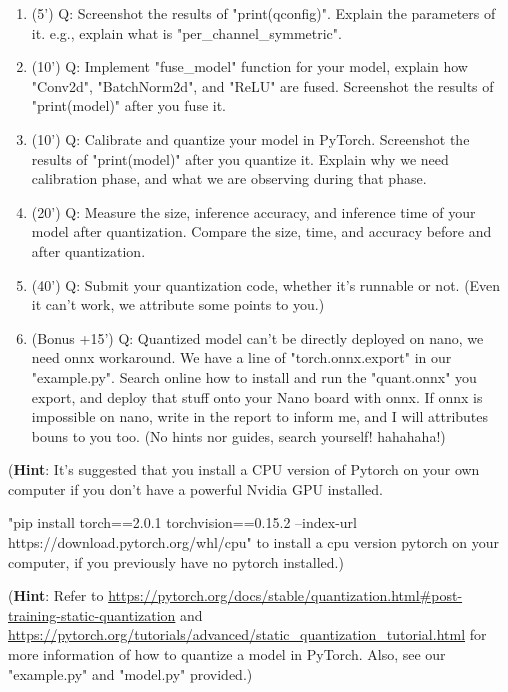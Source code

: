 \documentclass[12pt,a4paper]{article}
\theoremstyle{definition}
\begin{document}
\begin{enumerate}
    \item (5') Q: Screenshot the results of "print(qconfig)". Explain the parameters of it. e.g., explain what is "per\_channel\_symmetric".

    \item (10') Q: Implement "fuse\_model" function for your model, explain how "Conv2d", "BatchNorm2d", and "ReLU" are fused. Screenshot the results of "print(model)" after you fuse it.

    \item (10') Q: Calibrate and quantize your model in PyTorch. Screenshot the results of "print(model)" after you quantize it. Explain why we need calibration phase, and what we are observing during that phase.

    \item (20') Q: Measure the size, inference accuracy, and inference time of your model after quantization. Compare the size, time, and accuracy before and after quantization.

    \item (40') Q: Submit your quantization code, whether it's runnable or not. (Even it can't work, we attribute some points to you.)
    
    \item (Bonus +15') Q: Quantized model can't be directly deployed on nano, we need onnx workaround. We have a line of "torch.onnx.export" in our "example.py". Search online how to install and run the "quant.onnx" you export, and deploy that stuff onto your Nano board with onnx. If onnx is impossible on nano, write in the report to inform me, and I will attributes bouns to you too. (No hints nor guides, search yourself! hahahaha!)

    
\end{enumerate}

(\textbf{Hint}: It's suggested that you install a CPU version of Pytorch on your own computer if you don't have a powerful Nvidia GPU installed. 

"pip install torch==2.0.1 torchvision==0.15.2 --index-url https://download.pytorch.org/whl/cpu" to install a cpu version pytorch on your computer, if you previously have no pytorch installed.)

(\textbf{Hint}: Refer to \href{PyTorch PTSQ}{https://pytorch.org/docs/stable/quantization.html\#post-training-static-quantization} and \href{PyTorch PTSQ for MBNet}{https://pytorch.org/tutorials/advanced/static\_quantization\_tutorial.html} for more information of how to quantize a model in PyTorch. Also, see our "example.py" and "model.py" provided.)
\end{document}
